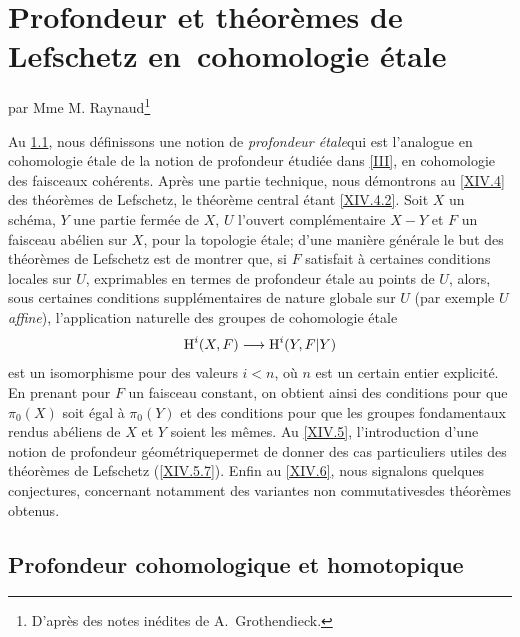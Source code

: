 \chapter[Profondeur et th\'eor\`emes de Lefschetz]
{Profondeur et th\'eor\`emes de Lefschetz en~cohomologie \'etale} \label{XIV}
\begin{center}
par Mme M. Raynaud\footnote{D'apr\`es des notes in\'edites de A.~Grothendieck.}
\end{center}

\vspace*{1cm}
Au \numero \ref{XIV.1}, nous d\'efinissons une notion de \og \textit{profondeur étale}\fg qui est l'analogue en cohomologie \'etale de la notion de profondeur \'etudi\'ee dans \ref{III}, en cohomologie des faisceaux coh\'erents. Apr\`es une partie technique, nous d\'emontrons au \numero \ref{XIV.4} des \og th\'eor\`emes de Lefschetz\fg, le th\'eor\`eme central \'etant \ref{XIV.4.2}. Soit $X$ un sch\'ema, $Y$ une partie ferm\'ee de $X$, $U$ l'ouvert compl\'ementaire $X-Y$ et $F$ un faisceau ab\'elien sur $X$, pour la topologie \'etale; d'une mani\`ere g\'en\'erale le but des th\'eor\`emes de Lefschetz est de montrer que, si $F$ satisfait \`a certaines conditions locales sur $U$, exprimables en termes de profondeur \'etale au points de $U$, alors, sous certaines conditions suppl\'ementaires de nature globale sur $U$ (par exemple $U$ \textit{affine}), l'application naturelle des groupes de cohomologie \'etale
$$
\H^i(X, F)\to \H^i(Y, F{|Y})$$
est un isomorphisme pour des valeurs $i<n$, o\`u $n$ est un certain entier explicit\'e. En prenant pour $F$ un faisceau constant, on obtient ainsi des conditions pour que $\pi_0(X)$ soit \'egal \`a $\pi_0(Y)$ et des conditions pour que les groupes fondamentaux rendus ab\'eliens de $X$ et $Y$ soient les m\^emes. Au \numero \ref{XIV.5}, l'introduction d'une notion de \og profondeur g\'eom\'etrique\fg permet de donner des cas particuliers utiles des th\'eor\`emes de Lefschetz (\ref{XIV.5.7}). Enfin au \numero \ref{XIV.6}, nous signalons quelques conjectures, concernant notamment des variantes \og non commutatives\fg des th\'eor\`emes obtenus.

\section{Profondeur cohomologique et homotopique}\label{XIV.1}

\setcounter{subsection}{-1}

